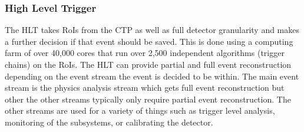\subsubsection{High Level Trigger}
The HLT takes RoIs from the CTP as well as full detector granularity and makes a further decision if that event should be saved.  This is done using a computing farm of over 40,000 cores that run over 2,500 independent algorithms (trigger chains) on the RoIs.  The HLT can provide partial and full event reconstruction depending on the event stream the event is decided to be within.  The main event stream is the physics analysis stream which gets full event reconstruction but other the other streams typically only require partial event reconstruction.  The other streams are used for a variety of things such as trigger level analysis, monitoring of the subsystems, or calibrating the detector.


